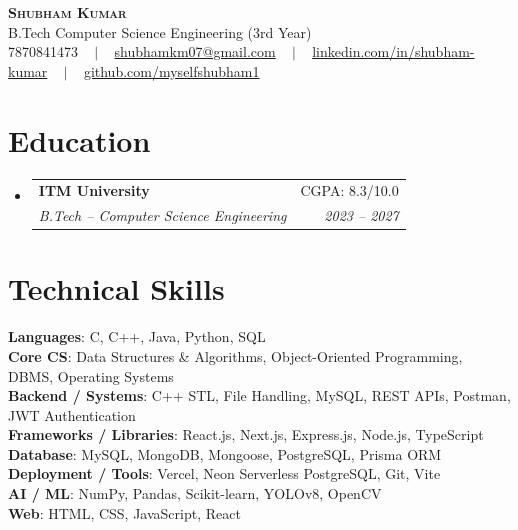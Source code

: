 \documentclass[letterpaper,10.5pt]{article}
\makeatletter
\newcommand{\resumeSubheading}[4]{
  \vspace{-2pt}\item
    \begin{tabular*}{0.97\textwidth}[t]{l@{\extracolsep{\fill}}r}
      \textbf{#1} & #2 \\
      \textit{\small#3} & \textit{\small #4} \\
    \end{tabular*}\vspace{-7pt}
}
\newcommand{\resumeSubHeadingListStart}{\begin{itemize}[leftmargin=0.15in, label={}]}
\newcommand{\resumeSubHeadingListEnd}{\end{itemize}}
\makeatother
\begin{document}
\begin{center}
    \textbf{\Huge \scshape Shubham Kumar} \\ \vspace{2pt}
    \small B.Tech Computer Science Engineering (3rd Year) \\ \vspace{3pt}
    \small 7870841473 ~ $|$ ~
    \href{mailto:shubhamkm07@gmail.com}{shubhamkm07@gmail.com} ~ $|$ ~
    \href{https://www.linkedin.com/in/shubham-kumar-05a9a5285/}{linkedin.com/in/shubham-kumar} ~ $|$ ~
    \href{https://github.com/myselfshubham1}{github.com/myselfshubham1}
\end{center}

\section{Education}
  \resumeSubHeadingListStart
    \resumeSubheading
      {ITM University}{CGPA: 8.3/10.0}
      {B.Tech -- Computer Science Engineering}{2023 -- 2027}
  \resumeSubHeadingListEnd

\section{Technical Skills}
 \begin{itemize}[leftmargin=0.15in, label={}]
    \small{\item{
     \textbf{Languages}{: C, C++, Java, Python, SQL} \\
     \textbf{Core CS}{: Data Structures \& Algorithms, Object-Oriented Programming, DBMS, Operating Systems} \\
     \textbf{Backend / Systems}{: C++ STL, File Handling, MySQL, REST APIs, Postman, JWT Authentication} \\
     \textbf{Frameworks / Libraries}{: React.js, Next.js, Express.js, Node.js, TypeScript} \\
     \textbf{Database}{: MySQL, MongoDB, Mongoose, PostgreSQL, Prisma ORM} \\
     \textbf{Deployment / Tools}{: Vercel, Neon Serverless PostgreSQL, Git, Vite} \\
     \textbf{AI / ML}{: NumPy, Pandas, Scikit-learn, YOLOv8, OpenCV} \\
     \textbf{Web}{: HTML, CSS, JavaScript, React}
    }}
 \end{itemize}

\end{document}
